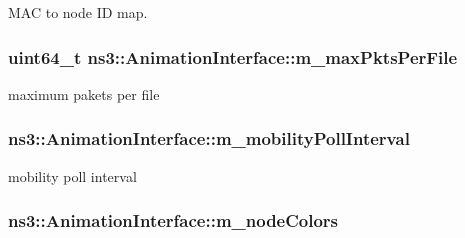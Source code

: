 M\+AC to node ID map. 

\subsubsection[{\texorpdfstring{m\+\_\+max\+Pkts\+Per\+File}{m_maxPktsPerFile}}]{\setlength{\rightskip}{0pt plus 5cm}uint64\+\_\+t ns3\+::\+Animation\+Interface\+::m\+\_\+max\+Pkts\+Per\+File\hspace{0.3cm}{\ttfamily [private]}}\hypertarget{classns3_1_1AnimationInterface_a608065fd3e594b67f812353171a1303b}{}\label{classns3_1_1AnimationInterface_a608065fd3e594b67f812353171a1303b}


maximum pakets per file 

\subsubsection[{\texorpdfstring{m\+\_\+mobility\+Poll\+Interval}{m_mobilityPollInterval}}]{ ns3\+::\+Animation\+Interface\+::m\+\_\+mobility\+Poll\+Interval\hspace{0.3cm}{\ttfamily [private]}}\hypertarget{classns3_1_1AnimationInterface_ae6cb45a110077b892accd3f3780c33b2}{}\label{classns3_1_1AnimationInterface_ae6cb45a110077b892accd3f3780c33b2}


mobility poll interval 

\subsubsection[{\texorpdfstring{m\+\_\+node\+Colors}{m_nodeColors}}]{ ns3\+::\+Animation\+Interface\+::m\+\_\+node\+Colors\hspace{0.3cm}{\ttfamily [private]}}\hypertarget{classns3_1_1AnimationInterface_a39d92e93523358f94cd6211da106ba8b}{}\label{classns3_1_1AnimationInterface_a39d92e93523358f94cd6211da106ba8b}


